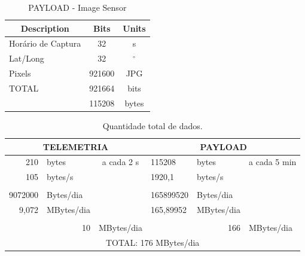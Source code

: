 \begin{apendicesenv}
\begin{table}[h]
\centering
\caption{PAYLOAD - Image Sensor}
\label{my-label}
\begin{tabular}{@{}lcc@{}}
\toprule
\multicolumn{1}{c}{Description} & Bits   & Units                      \\ \midrule
Horário de Captura              & 32     & s                          \\
Lat/Long                        & 32     & $^{\circ}$                 \\
Pixels                          & 921600 & JPG                        \\ \midrule
\multicolumn{1}{|l|}{TOTAL}      & 921664 & \multicolumn{1}{c|}{bits}  \\
\multicolumn{1}{|l|}{}           & 115208 & \multicolumn{1}{c|}{bytes} \\ \bottomrule
\end{tabular}
\end{table}

\begin{table}[h]
\centering
\caption{Quantidade total de dados.}
\label{my-label}
\begin{tabular}{@{}rlc|lll@{}}
\toprule
\multicolumn{3}{|c|}{TELEMETRIA}                                   & \multicolumn{3}{c|}{PAYLOAD}                       \\ \midrule
210     & bytes                  & a cada 2 s                      & 115208    & bytes                   & a cada 5 min \\
105     & bytes/s                &                                 & 1920,1    & bytes/s                 &              \\
        &                        &                                 &           &                         &              \\
9072000 & Bytes/dia              &                                 & 165899520 & Bytes/dia               &              \\
9,072   & MBytes/dia             &                                 & 165,89952 & MBytes/dia              &              \\
        &                        & \multicolumn{1}{l|}{}           &           &                         &              \\
        & \multicolumn{1}{r}{10} & \multicolumn{1}{l|}{MBytes/dia} &           & \multicolumn{1}{r}{166} & MBytes/dia   \\ \midrule
\multicolumn{6}{|c|}{TOTAL: 176 MBytes/dia}    \\ \bottomrule
\end{tabular}
\end{table}



\end{apendicesenv}
